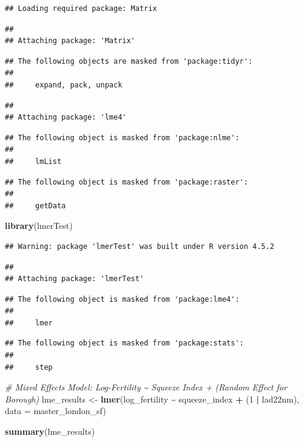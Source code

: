 \documentclass[
]{article}
\newenvironment{Shaded}{\begin{snugshade}}{\end{snugshade}}
\newcommand{\AttributeTok}[1]{\textcolor[rgb]{0.13,0.29,0.53}{#1}}
\newcommand{\CommentTok}[1]{\textcolor[rgb]{0.56,0.35,0.01}{\textit{#1}}}
\newcommand{\DecValTok}[1]{\textcolor[rgb]{0.00,0.00,0.81}{#1}}
\newcommand{\FunctionTok}[1]{\textcolor[rgb]{0.13,0.29,0.53}{\textbf{#1}}}
\newcommand{\NormalTok}[1]{#1}
\newcommand{\OtherTok}[1]{\textcolor[rgb]{0.56,0.35,0.01}{#1}}
\newcommand{\SpecialCharTok}[1]{\textcolor[rgb]{0.81,0.36,0.00}{\textbf{#1}}}
\begin{document}
\begin{verbatim}
## Loading required package: Matrix
\end{verbatim}

\begin{verbatim}
## 
## Attaching package: 'Matrix'
\end{verbatim}

\begin{verbatim}
## The following objects are masked from 'package:tidyr':
## 
##     expand, pack, unpack
\end{verbatim}

\begin{verbatim}
## 
## Attaching package: 'lme4'
\end{verbatim}

\begin{verbatim}
## The following object is masked from 'package:nlme':
## 
##     lmList
\end{verbatim}

\begin{verbatim}
## The following object is masked from 'package:raster':
## 
##     getData
\end{verbatim}

\begin{Shaded}
\begin{Highlighting}[]
\FunctionTok{library}\NormalTok{(lmerTest)}
\end{Highlighting}
\end{Shaded}

\begin{verbatim}
## Warning: package 'lmerTest' was built under R version 4.5.2
\end{verbatim}

\begin{verbatim}
## 
## Attaching package: 'lmerTest'
\end{verbatim}

\begin{verbatim}
## The following object is masked from 'package:lme4':
## 
##     lmer
\end{verbatim}

\begin{verbatim}
## The following object is masked from 'package:stats':
## 
##     step
\end{verbatim}

\begin{Shaded}
\begin{Highlighting}[]
\CommentTok{\# Mixed Effects Model: Log{-}Fertility \textasciitilde{} Squeeze Index + (Random Effect for Borough)}
\NormalTok{lme\_results }\OtherTok{\textless{}{-}} \FunctionTok{lmer}\NormalTok{(log\_fertility }\SpecialCharTok{\textasciitilde{}}\NormalTok{ squeeze\_index }\SpecialCharTok{+}\NormalTok{ (}\DecValTok{1} \SpecialCharTok{|}\NormalTok{ lad22nm), }
                   \AttributeTok{data =}\NormalTok{ master\_london\_sf)}

\FunctionTok{summary}\NormalTok{(lme\_results)}
\end{Highlighting}
\end{Shaded}
\end{document}
